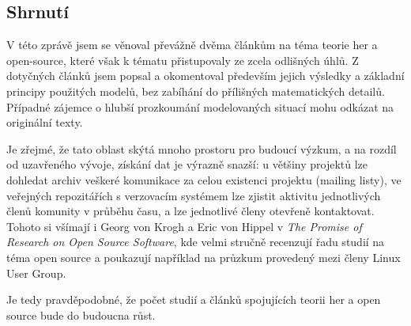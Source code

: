\begin{multicols}{2}
\section{Shrnutí}
	V této zprávě jsem se věnoval převážně dvěma článkům na téma teorie her a open-source, které však k tématu přistupovaly ze zcela odlišných úhlů. Z dotyčných článků jsem popsal a okomentoval především jejich výsledky a základní principy použitých modelů, bez zabíhání do přílišných matematických detailů. Případné zájemce o hlubší prozkoumání modelovaných situací mohu odkázat na originální texty.

	Je zřejmé, že tato oblast skýtá mnoho prostoru pro budoucí výzkum, a na rozdíl od uzavřeného vývoje, získání dat je výrazně snazší: u většiny projektů lze dohledat archiv veškeré komunikace za celou existenci projektu (mailing listy), ve veřejných repozitářích s verzovacím systémem lze zjistit aktivitu jednotlivých členů komunity v průběhu času, a lze jednotlivé členy otevřeně kontaktovat. Tohoto si všímají i Georg von Krogh a Eric von Hippel v {\em The Promise of Research on Open Source Software}, kde velmi stručně recenzují řadu studií na téma open source a poukazují například na průzkum provedený mezi členy Linux User Group.

	Je tedy pravděpodobné, že počet studií a článků spojujících teorii her a open source bude do budoucna růst.






%

\end{multicols}
